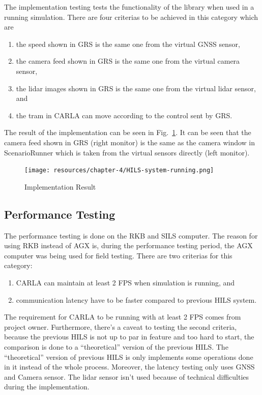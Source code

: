 The implementation testing tests the functionality of the library when used in a
running simulation. There are four criterias to be achieved in this category which are

\begin{enumerate}
	\item the speed shown in GRS is the same one from the virtual GNSS sensor,
	\item the camera feed shown in GRS is the same one from the virtual camera
	      sensor,
	\item the lidar images shown in GRS is the same one from the virtual lidar
	      sensor, and
	\item the tram in CARLA can move according to the control sent by GRS.
\end{enumerate}

The result of the implementation can be seen in
Fig.~\ref{fig-section-5-implementation-results}. It can be seen that the camera
feed shown in GRS (right monitor) is the same as the camera window in
ScenarioRunner which is taken from the virtual sensors directly (left monitor).

\begin{figure}[htbp]
	\centerline{\texttt{[image: resources/chapter-4/HILS-system-running.png]}}
	\caption{Implementation Result}
	\label{fig-section-5-implementation-results}
\end{figure}

\subsection{Performance Testing}

The performance testing is done on the RKB and SILS computer. The reason for
using RKB instead of AGX is, during the performance testing period, the AGX
computer was being used for field testing. There are two criterias for this
category:
\begin{enumerate}
	\item CARLA can maintain at least 2 FPS when simulation is running, and
	\item communication latency have to be faster compared to previous HILS
	      system.
\end{enumerate}
The requirement for CARLA to be running with at least 2 FPS comes from project
owner. Furthermore, there's a caveat to testing the second criteria, because the
previous HILS is not up to par in feature and too hard to start, the comparison
is done to a ``theoretical'' version of the previous HILS. The ``theoretical''
version of previous HILS is only implements some operations done in it instead
of the whole process. Moreover, the latency testing only uses GNSS and Camera
sensor. The lidar sensor isn't used because of technical difficulties during the
implementation.

